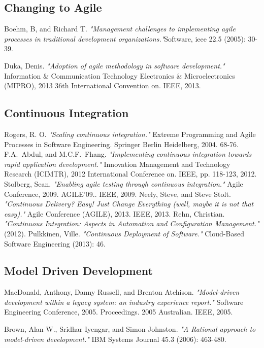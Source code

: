 \documentclass[ProjectPlan_innit.tex]{subfiles}
\begin{document}
\renewcommand\refname{VI. Initial Literature List}

\begin{thebibliography}{1}


\subsection{Changing to Agile}
\bibitem{}
Boehm, B, and Richard T. \emph{"Management challenges to implementing agile processes in traditional development organizations."}Software, ieee 22.5 (2005): 30-39.

\bibitem{}
Duka, Denis. \emph{"Adoption of agile methodology in software development."} Information \& Communication Technology Electronics \& Microelectronics (MIPRO), 2013 36th International Convention on. IEEE, 2013.


\subsection{Continuous Integration}
\bibitem{} 
Rogers, R. O. \emph{"Scaling continuous integration."} Extreme Programming and Agile Processes in Software Engineering. Springer Berlin Heidelberg, 2004. 68-76.
\bibitem{} 
F.A.~Abdul, and M.C.F.~Fhang. \emph{"Implementing continuous integration towards rapid application development."} Innovation Management and Technology Research (ICIMTR), 2012 International Conference on. IEEE, pp. 118-123, 2012.
\bibitem{} 
Stolberg, Sean. \emph{"Enabling agile testing through continuous integration."} Agile Conference, 2009. AGILE'09.. IEEE, 2009.
\bibitem{}
Neely, Steve, and Steve Stolt. \emph{"Continuous Delivery? Easy! Just Change Everything (well, maybe it is not that easy)."} Agile Conference (AGILE), 2013. IEEE, 2013.
\bibitem{} 
Rehn, Christian. \emph{"Continuous Integration: Aspects in Automation and Configuration Management."} (2012).
\bibitem{} 
Pulkkinen, Ville. \emph{"Continuous Deployment of Software."} Cloud-Based Software Engineering (2013): 46.


\subsection{Model Driven Development}
\bibitem{} 
MacDonald, Anthony, Danny Russell, and Brenton Atchison. \emph{"Model-driven development within a legacy system: an industry experience report."} Software Engineering Conference, 2005. Proceedings. 2005 Australian. IEEE, 2005.

\bibitem{}
Brown, Alan W., Sridhar Iyengar, and Simon Johnston. \emph{"A Rational approach to model-driven development."} IBM Systems Journal 45.3 (2006): 463-480.


\end{thebibliography}
\end{document}
